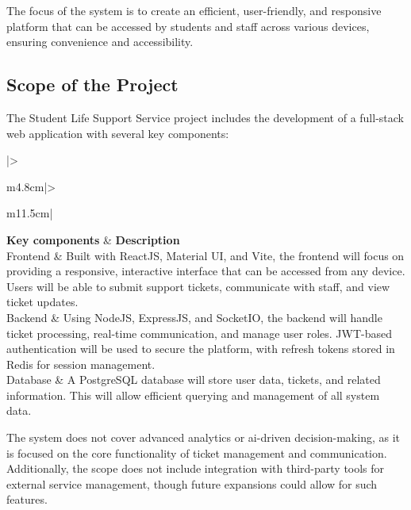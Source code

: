 \noindent The focus of the system is to create an efficient, user-friendly, and responsive platform that can be accessed by students and staff across various devices, ensuring convenience and accessibility.

\subsection{Scope of the Project}
The Student Life Support Service project includes the development of a full-stack web application with several key components:

	\begin{longtable}{{|>{\raggedright\arraybackslash}m{4.8cm}|>{\raggedright\arraybackslash}m{11.5cm}|}} 
		\hline
		\textbf{Key components} & \textbf{Description}\\ \hline
		Frontend & Built with ReactJS, Material UI, and Vite, the frontend will focus on providing a responsive, interactive interface that can be accessed from any device. Users will be able to submit support tickets, communicate with staff, and view ticket updates.
		\\ \hline
		Backend & Using NodeJS, ExpressJS, and SocketIO, the backend will handle ticket processing, real-time communication, and manage user roles. JWT-based authentication will be used to secure the platform, with refresh tokens stored in Redis for session management.
		\\ \hline
		Database & A PostgreSQL database will store user data, tickets, and related information. This will allow efficient querying and management of all system data.
		\\ \hline
		
		
		\caption{System key components} %
		\label{tab:sys-key-components}
	\end{longtable}
\noindent The system does not cover advanced analytics or \acs{ai}-driven decision-making, as it is focused on the core functionality of ticket management and communication. Additionally, the scope does not include integration with third-party tools for external service management, though future expansions could allow for such features.

